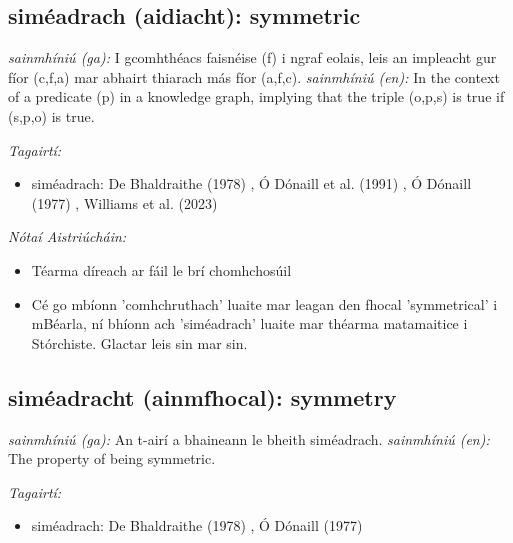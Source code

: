 \documentclass{article}
\begin{document}
\subsection*{siméadrach (aidiacht): symmetric} 
 \noindent \textit{sainmhíniú (ga):} I gcomhthéacs faisnéise (f) i ngraf eolais, leis an impleacht gur fíor (c,f,a) mar abhairt thiarach más fíor (a,f,c).
\newline\newline
 \noindent \textit{sainmhíniú (en):} In the context of a predicate (p) in a knowledge graph, implying that the triple (o,p,s) is true if (s,p,o) is true.
\newline

 \noindent \textit{Tagairtí:}
\begin{itemize}
	\item siméadrach: De Bhaldraithe (1978) \cite{de-bhaldraithe}, Ó Dónaill et al. (1991) \cite{focloir-beag}, Ó Dónaill (1977) \cite{odonaill}, Williams et al. (2023) \cite{storchiste}
\end{itemize}

 \noindent \textit{Nótaí Aistriúcháin:}
\begin{itemize}
	\item Téarma díreach ar fáil le brí chomhchosúil
	\item Cé go mbíonn 'comhchruthach' luaite mar leagan den fhocal 'symmetrical' i mBéarla, ní bhíonn ach 'siméadrach' luaite mar théarma matamaitice i Stórchiste. Glactar leis sin mar sin.
\end{itemize}


\subsection*{siméadracht (ainmfhocal): symmetry} 
 \noindent \textit{sainmhíniú (ga):} An t-airí a bhaineann le bheith siméadrach.
\newline\newline
 \noindent \textit{sainmhíniú (en):} The property of being symmetric.
\newline

 \noindent \textit{Tagairtí:}
\begin{itemize}
	\item siméadrach: De Bhaldraithe (1978) \cite{de-bhaldraithe}, Ó Dónaill (1977) \cite{odonaill}
\end{itemize}
\end{document}
